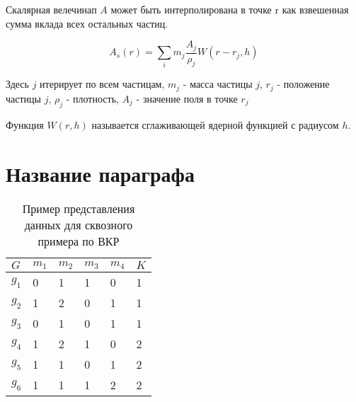 Скалярная велечинап $A$ может быть интерполирована в точке r как взвешенная
сумма вклада всех остальных частиц.

\begin{equation}
	A_s(r) = \sum_i m_j \frac{A_j}{\rho_j} W(r - r_j, h)
\end{equation}

Здесь $j$ итерирует по всем частицам, $m_j$ - масса частицы $j$, $r_j$ -
положение частицы $j$, $\rho_j$ - плотность, $A_j$ - значение поля в точке $r_j$

Функция $W(r, h)$ называется сглаживающей ядерной функцией с радиусом $h$.


\section{Название параграфа} \label{ch2:sec-very-short-title} %





%



\begin{table} [htbp]%
	\centering\small
	\caption{Пример представления данных для сквозного примера по ВКР \cite{Peskov2004}}%
	\label{tab:ToyCompare}
	\begin{tabular}{|l|l|l|l|l|l|}
		\hline
		$G$   & $m_1$ & $m_2$ & $m_3$ & $m_4$ & $K$ \\
		\hline
		$g_1$ & 0     & 1     & 1     & 0     & 1   \\ \hline
		$g_2$ & 1     & 2     & 0     & 1     & 1   \\ \hline
		$g_3$ & 0     & 1     & 0     & 1     & 1   \\ \hline
		$g_4$ & 1     & 2     & 1     & 0     & 2   \\ \hline
		$g_5$ & 1     & 1     & 0     & 1     & 2   \\ \hline
		$g_6$ & 1     & 1     & 1     & 2     & 2   \\ \hline
	\end{tabular}
	\normalsize%
\end{table}



